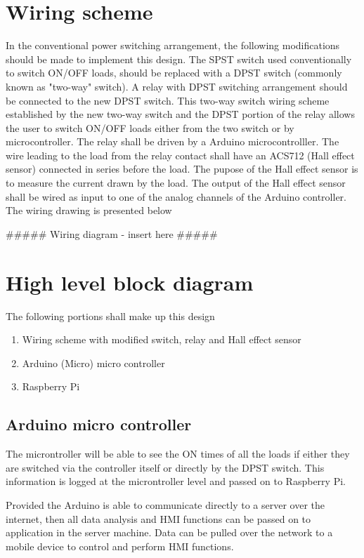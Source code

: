 \documentclass[11pt]{article}
\begin{document}
\section{Wiring scheme}
\label{sec:org5d4759e}
In the conventional power switching arrangement, the following
modifications should be made to implement this design. The SPST switch
used conventionally to switch ON/OFF loads, should be replaced with a
DPST switch (commonly known as "two-way" switch). A relay with DPST
switching arrangement should be connected to the new DPST switch. This
two-way switch wiring scheme established by the new two-way switch and
the DPST portion of the relay allows the user to switch ON/OFF loads
either from the two switch or by microcontroller. The relay shall be
driven by a Arduino microcontrolller. The wire leading to the load
from the relay contact shall have an ACS712 (Hall effect sensor)
connected in series before the load. The pupose of the Hall effect
sensor is to measure the current drawn by the load. The output of the
Hall effect sensor shall be wired as input to one of the analog
channels of the Arduino controller.  The wiring drawing is presented below

\#\#\#\#\# Wiring diagram - insert here \#\#\#\#\#

\section{High level block diagram}
\label{sec:org78a47c7}
The following portions shall make up this design
\begin{enumerate}
\item Wiring scheme with modified switch, relay and Hall effect sensor
\item Arduino (Micro) micro controller
\item Raspberry Pi
\end{enumerate}

\subsection{Arduino micro controller}
\label{sec:org30fb435}
The microntroller will be able to see the ON times of all the loads if
either they are switched via the controller itself or directly by the
DPST switch. This information is logged at the microntroller level and
passed on to Raspberry Pi. 

Provided the Arduino is able to communicate directly to a server over
the internet, then all data analysis and HMI functions can be passed
on to application in the server machine. Data can be pulled over the
network to a mobile device to control and perform HMI functions.
\end{document}
